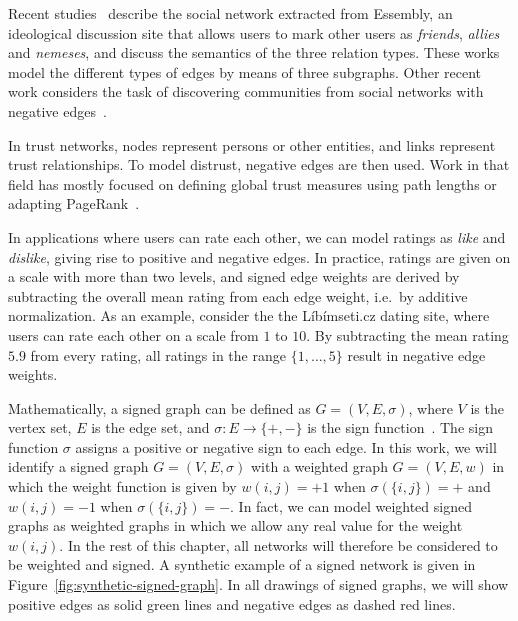 \documentclass[11pt,a4paper]{book}
\begin{document}
Recent studies~\cite{b270}
describe the social network extracted from Essembly, an ideological
discussion site that allows users to mark other users as \emph{friends},
\emph{allies} and \emph{nemeses}, and discuss the semantics of the three
relation types.  These works model the different types of edges by means
of three subgraphs.  
Other recent work considers the task of
discovering communities from social networks with negative
edges~\cite{b233}.   

In trust networks, nodes represent persons or other entities, and links
represent trust relationships. 
To model distrust, negative edges are then used. 
Work in that field has mostly focused on defining global trust measures
using path lengths or adapting PageRank~\cite{b235,b325,b236,b234,b237}. 

In applications where users can rate each other, we can model ratings as
\emph{like} and \emph{dislike}, giving rise to positive and negative
edges.  In practice, ratings are given on a scale with more than two
levels, and signed edge weights are derived by subtracting the overall
mean rating from each edge weight, i.e.\ by additive normalization.  As
an example, consider the
the Líbímseti.cz dating site, where users can rate each other on a scale from
$1$ to $10$.  By subtracting the mean rating $5.9$ from every
rating, all ratings in the range $\{1, \ldots, 5\}$ result in negative
edge weights. 

Mathematically, a signed graph can be defined as $G = (V,E,\sigma)$,
where $V$ is the vertex set, $E$ is the edge set, and $\sigma: E
\rightarrow \{+, -\}$ is the sign function~\cite{b324}.  
The sign function $\sigma$ assigns a positive or negative sign to each
edge.  In this work, we 
will identify a signed graph $G = (V, E, \sigma)$ with a weighted graph
$G = (V, E, w)$ in which the weight function is given by $w(i,j) = +1$ when
$\sigma(\{i,j\}) = +$ and $w(i,j) = -1$ when $\sigma(\{i,j\}) = -$.  In
fact, we can model weighted signed graphs as weighted graphs in which we
allow any real value for the weight $w(i,j)$.  In the rest of this
chapter, all networks will therefore be considered to be weighted and
signed.
A synthetic example of a signed network is given in
Figure~\ref{fig:synthetic-signed-graph}.  In all drawings of signed graphs,
we will show positive edges as solid green lines and negative
edges as dashed red lines. 
\end{document}
